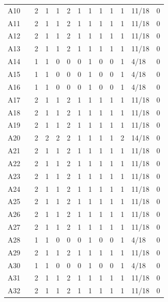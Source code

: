 {\begin{longtable}{p{0.55cm}p{0.9cm}rrrrrrrrrp{1.1cm}p{1.0cm}}
A10 & \cite{10017647} & 2 & 1 & 1 & 2 & 1 & 1 & 1 & 1 & 1 & 11/18 & 0 \\
A11 & \cite{app12105224} & 2 & 1 & 1 & 2 & 1 & 1 & 1 & 1 & 1 & 11/18 & 0 \\
A12 & \cite{10219564} & 2 & 1 & 1 & 2 & 1 & 1 & 1 & 1 & 1 & 11/18 & 0 \\
A13 & \cite{10003194} & 2 & 1 & 1 & 2 & 1 & 1 & 1 & 1 & 1 & 11/18 & 0 \\
A14 & \cite{10083532} & 1 & 1 & 0 & 0 & 0 & 1 & 0 & 0 & 1 & 4/18 & 0 \\
A15 & \cite{SHAO20231} & 1 & 1 & 0 & 0 & 0 & 1 & 0 & 0 & 1 & 4/18 & 0 \\
A16 & \cite{Ahmad2023} & 1 & 1 & 0 & 0 & 0 & 1 & 0 & 0 & 1 & 4/18 & 0 \\
A17 & \cite{10269044} & 2 & 1 & 1 & 2 & 1 & 1 & 1 & 1 & 1 & 11/18 & 0 \\
A18 & \cite{10622352} & 2 & 1 & 1 & 2 & 1 & 1 & 1 & 1 & 1 & 11/18 & 0 \\
A19 & \cite{10942760} & 2 & 1 & 1 & 2 & 1 & 1 & 1 & 1 & 1 & 11/18 & 0 \\
A20 & \cite{10894874} & 2 & 2 & 2 & 2 & 1 & 1 & 1 & 1 & 2 & 14/18 & 0 \\
A21 & \cite{10812245} & 2 & 1 & 1 & 2 & 1 & 1 & 1 & 1 & 1 & 11/18 & 0 \\
A22 & \cite{Silva2024} & 2 & 1 & 1 & 2 & 1 & 1 & 1 & 1 & 1 & 11/18 & 0 \\
A23 & \cite{10420514} & 2 & 1 & 1 & 2 & 1 & 1 & 1 & 1 & 1 & 11/18 & 0 \\
A24 & \cite{Ahmad2024} & 2 & 1 & 1 & 2 & 1 & 1 & 1 & 1 & 1 & 11/18 & 0 \\
A25 & \cite{Venkatasamy2024} & 2 & 1 & 1 & 2 & 1 & 1 & 1 & 1 & 1 & 11/18 & 0 \\
A26 & \cite{Fang2024} & 2 & 1 & 1 & 2 & 1 & 1 & 1 & 1 & 1 & 11/18 & 0 \\
A27 & \cite{Chehida2024} & 2 & 1 & 1 & 2 & 1 & 1 & 1 & 1 & 1 & 11/18 & 0 \\
A28 & \cite{10468686} & 1 & 1 & 0 & 0 & 0 & 1 & 0 & 0 & 1 & 4/18 & 0 \\
A29 & \cite{10837268} & 2 & 1 & 1 & 2 & 1 & 1 & 1 & 1 & 1 & 11/18 & 0 \\
A30 & \cite{Khan2024Thesis} & 1 & 1 & 0 & 0 & 0 & 1 & 0 & 0 & 1 & 4/18 & 0 \\
A31 & \cite{10908619} & 2 & 1 & 1 & 2 & 1 & 1 & 1 & 1 & 1 & 11/18 & 0 \\
A32 & \cite{10985891} & 2 & 1 & 1 & 2 & 1 & 1 & 1 & 1 & 1 & 11/18 & 0 \\

\end{longtable}}
